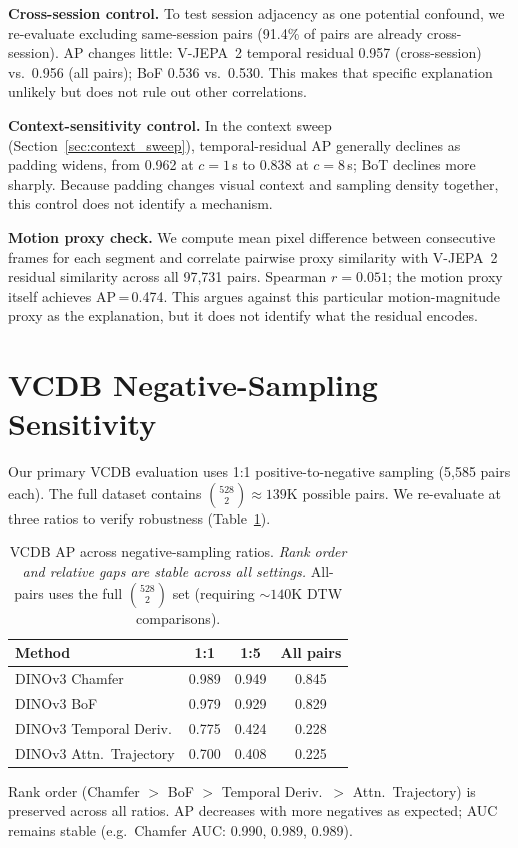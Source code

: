 \documentclass{article}
\theoremstyle{remark}
\begin{document}
\textbf{Cross-session control.} To test session adjacency as one potential confound, we re-evaluate excluding same-session pairs (91.4\% of pairs are already cross-session). AP changes little: V-JEPA~2 temporal residual 0.957 (cross-session) vs.\ 0.956 (all pairs); BoF 0.536 vs.\ 0.530. This makes that specific explanation unlikely but does not rule out other correlations.

\textbf{Context-sensitivity control.} In the context sweep (Section~\ref{sec:context_sweep}), temporal-residual AP generally declines as padding widens, from 0.962 at $c\!=\!1$\,s to 0.838 at $c\!=\!8$\,s; BoT declines more sharply. Because padding changes visual context and sampling density together, this control does not identify a mechanism.

\textbf{Motion proxy check.} We compute mean pixel difference between consecutive frames for each segment and correlate pairwise proxy similarity with V-JEPA~2 residual similarity across all 97{,}731 pairs. Spearman $r = 0.051$; the motion proxy itself achieves AP\,=\,0.474. This argues against this particular motion-magnitude proxy as the explanation, but it does not identify what the residual encodes.

\section{VCDB Negative-Sampling Sensitivity}
\label{sec:neg_sampling}

Our primary VCDB evaluation uses 1:1 positive-to-negative sampling (5{,}585 pairs each). The full dataset contains $\binom{528}{2} \approx 139$K possible pairs. We re-evaluate at three ratios to verify robustness (Table~\ref{tab:neg_sensitivity}).

\begin{table}[h]
\centering
\caption{VCDB AP across negative-sampling ratios. \emph{Rank order and relative gaps are stable across all settings.} All-pairs uses the full $\binom{528}{2}$ set (requiring ${\sim}140$K DTW comparisons).}
\label{tab:neg_sensitivity}
\begin{tabular}{lccc}
\toprule
\textbf{Method} & \textbf{1:1} & \textbf{1:5} & \textbf{All pairs} \\
\midrule
DINOv3 Chamfer           & 0.989 & 0.949 & 0.845 \\
DINOv3 BoF               & 0.979 & 0.929 & 0.829 \\
DINOv3 Temporal Deriv.   & 0.775 & 0.424 & 0.228 \\
DINOv3 Attn.\ Trajectory & 0.700 & 0.408 & 0.225 \\
\bottomrule
\end{tabular}
\begin{flushleft}
\small Rank order (Chamfer $>$ BoF $>$ Temporal Deriv.\ $>$ Attn.\ Trajectory) is preserved across all ratios. AP decreases with more negatives as expected; AUC remains stable (e.g.\ Chamfer AUC: 0.990, 0.989, 0.989).
\end{flushleft}
\end{table}
\end{document}
